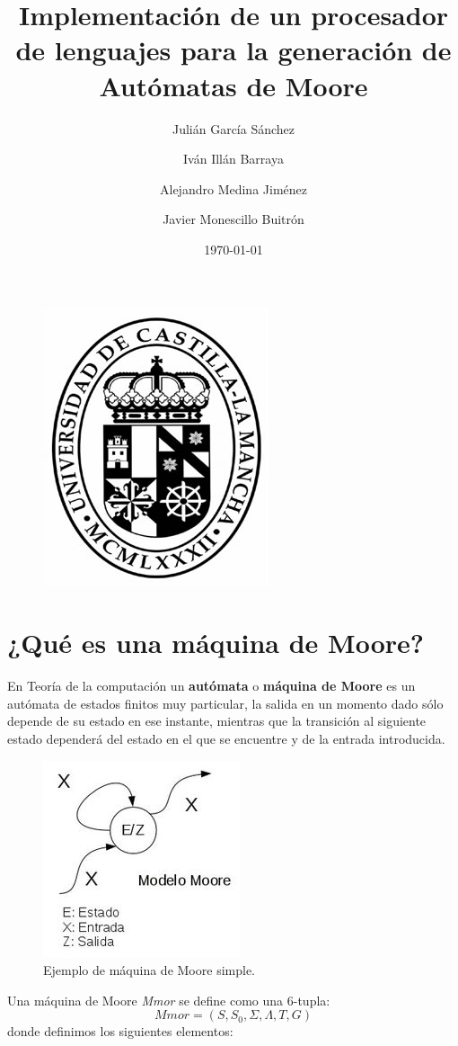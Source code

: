 \documentclass[12pt,a4paper]{article}
\author{Julián García Sánchez \and Iván Illán Barraya \and Alejandro Medina Jiménez \and Javier Monescillo Buitrón}
\title{Implementación de un procesador de lenguajes para la generación de Autómatas de Moore}
\date{\today}
\begin{document}
	
	\maketitle
	
	\begin{figure}[h]
		\centering
		\includegraphics[width=0.25
		\linewidth]{img/uclm}
		\caption{}
		\label{fig:image004}
	\end{figure}

	\newpage
	\tableofcontents
	\newpage
	
\section{¿Qué es una máquina de Moore?}
	
En Teoría de la computación un \textbf{autómata} o \textbf{máquina de Moore} es un autómata de estados finitos muy particular, la salida en un momento dado sólo depende de su estado en ese instante, mientras que la transición al siguiente estado dependerá del estado en el que se encuentre y de la entrada introducida.
\newline
	
	\begin{figure}[h]
		\centering
		\includegraphics[width=0.5
		\linewidth]{img/modelo-moore}
		\caption{Ejemplo de máquina de Moore simple.}
		\label{fig:modelo-moore}
	\end{figure}
	
Una máquina de Moore \textit{Mmor} se define como una 6-tupla:
	\[ Mmor = (S,S_{0},\Sigma,\Lambda,T,G)  \]
donde definimos los siguientes elementos:
	
\end{document}
